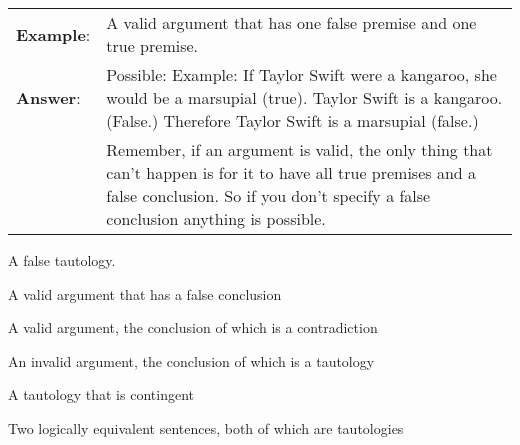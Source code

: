 \begin{longtabu}{p{.1\linewidth}p{.9\linewidth}}
\textbf{Example}: & A valid argument that has one false premise and one true premise.\\
\textbf{Answer}: & Possible: Example: If Taylor Swift were a kangaroo, she would be a marsupial (true). Taylor Swift is a kangaroo. (False.) Therefore Taylor Swift is a marsupial (false.)\\ &Remember, if an argument is valid, the only thing that can't happen is for it to have all true premises and a false conclusion. So if you don't specify a false conclusion anything is possible.\\
\end{longtabu}



\begin{exercises}
\item A false tautology. 


\item A valid argument that has a false conclusion


\item A valid argument, the conclusion of which is a contradiction


\item An invalid argument, the conclusion of which is a tautology


\item A tautology that is contingent



\item Two logically equivalent sentences, both of which are tautologies


\end{exercises}
